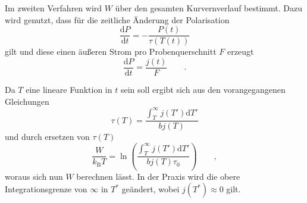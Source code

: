 Im zweiten Verfahren wird $W$ über den gesamten Kurvernverlauf bestimmt.
Dazu wird genutzt, dass für die zeitliche Änderung der Polarisation
\begin{equation*}
    \frac{\mathrm{d}P}{\mathrm{d}t} = - \frac{ P(t) }{ \tau(T(t))}
\end{equation*}
gilt und diese einen äußeren Strom pro Probenquerschnitt $F$ erzeugt
\begin{equation*}
    \frac{\mathrm{d}P}{\mathrm{d}t} = \frac{j(t)}{F} \qquad.
\end{equation*}

Da $T$ eine lineare Funktion in $t$ sein soll ergibt sich aus den vorangegangenen Gleichungen
\begin{equation*}
    \tau(T) = \frac{ \int_{T}^\infty j(T') \mathrm{d}T' }{ b j(T) } 
\end{equation*}
und durch ersetzen von $\tau(T)$ 
\begin{equation}
    \label{eqn:integrate}
     \frac{ W }{ k_\mathrm{B} T } = \ln{ \left( \frac{ \int_{T}^\infty j(T') \mathrm{d}T' }{ b j(T) \tau_0 } \right) } \qquad ,
\end{equation}
woraus sich nun $W$ berechnen lässt.
In der Praxis wird die obere Integrationsgrenze von $\infty$ in $T^*$ geändert, wobei $j(T^*) \approx 0$ gilt.
\cite{sample}
